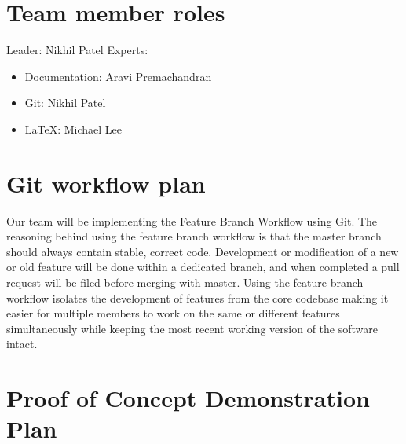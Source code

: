 \documentclass{article}
\begin{document}
\section{Team member roles}

\noindent Leader: Nikhil Patel \newline \noindent Experts: \vspace{-2mm}
\begin{itemize} \itemsep0em \item Documentation: Aravi Premachandran \item Git:
Nikhil Patel \item LaTeX: Michael Lee \end{itemize}

\section{Git workflow plan} 

\noindent Our team will be implementing the Feature Branch Workflow using Git.
The reasoning behind using the feature branch workflow is that the master branch
should always contain stable, correct code. Development or modification of a new
or old feature will be done within a dedicated branch, and when completed a pull
request will be filed before merging with master. Using the feature branch
workflow isolates the development of features from the core codebase making it
easier for multiple members to work on the same or different features
simultaneously while keeping the most recent working version of the software
intact.


\section{Proof of Concept Demonstration Plan}
\end{document}
